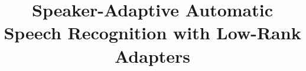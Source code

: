 \documentclass{Interspeech2024}
\title{Speaker-Adaptive Automatic Speech Recognition with Low-Rank Adapters}
\newcommand{\red}[1]{\textcolor{red}{#1}}
\begin{document}
\maketitle
















\begin{comment}
\begin{abstract}
    
    Manuscripts submitted to Interspeech 2024 must use this document as both an instruction set and as a template. Do not use a past paper as a template. Always start from a fresh copy, and read it all before replacing the content with your own. The main changes with respect to previous instructions are \red{highlighted in red}.
    Before submitting, check that your manuscript conforms to this template. If it does not, it may be rejected. Do not be tempted to adjust the format! Instead, edit your content to fit the allowed space. The maximum number of manuscript pages is 5. The 5th page is reserved exclusively for \red{acknowledgements} and references, which may begin on an earlier page if there is space.
    The abstract is limited to 1000 characters. The one in your manuscript and the one entered in the submission form must be identical. Avoid non-ASCII characters, symbols, maths, italics, etc as they may not display correctly in the abstract book. Do not use citations in the abstract: the abstract booklet will not include a bibliography.  Index terms appear immediately below the abstract. 
\end{abstract}
\section{Introduction}

Templates are provided on the conference website for Microsoft Word\textregistered, and \LaTeX. We strongly recommend \LaTeX\xspace
which can be used conveniently in a web browser on \url{overleaf.com} where this template is available in the Template Gallery.


\end{comment}
\end{document}
